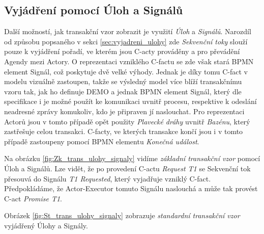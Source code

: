 \documentclass[]{article}
\begin{document}
\subsection{Vyjádření pomocí Úloh a Signálů}

Další možností, jak transakční vzor zobrazit je využití \textit{Úloh} a \textit{Signálů}. Narozdíl od způsobu popsaného v sekci \ref{sec:vyjadreni_ulohy} zde \textit{Sekvenční toky} slouží pouze k vyjádření pořadí, ve kterém jsou C-acty prováděny a pro převádění Agendy mezi Actory. O reprezentaci vzniklého C-factu se zde však stará BPMN element Signál, což poskytuje dvě velké výhody. Jednak je díky tomu C-fact v modelu vizuálně zastoupen, takže se výsledný model více blíží transakčnímu vzoru tak, jak ho definuje DEMO a jednak BPMN element Signál, který dle specifikace \cite{Omg2011} i \cite{Silver2011} je možné použít ke komunikaci uvnitř procesu, respektive k odeslání neadresné zprávy komukoliv, kdo je připraven jí naslouchat. Pro reprezentaci Actorů jsou v tomto případě opět použity \textit{Plavecké dráhy} uvnitř \textit{Bazénu}, který zastřešuje celou transakci. C-facty, ve kterých transakce končí jsou i v tomto případě zastoupeny pomocí BPMN elementu \textit{Konečná událost}.

Na obrázku \ref{fig:Zk_trans_ulohy_signaly} vidíme \textit{základní transakční vzor} pomocí Úloh a Signálů. Lze vidět, že po provedení C-actu \textit{Request T1} se Sekvenční tok přesouvá do Signálu \textit{T1 Requested}, který vyjadřuje vzniklý C-fact. Předpokládáme, že Actor-Executor tomuto Signálu naslouchá a může tak provést C-act \textit{Promise T1}.

Obrázek \ref{fig:St_trans_ulohy_signaly} zobrazuje \textit{standardní transakční vzor} vyjádřený Úlohy a Signály.
\end{document}
